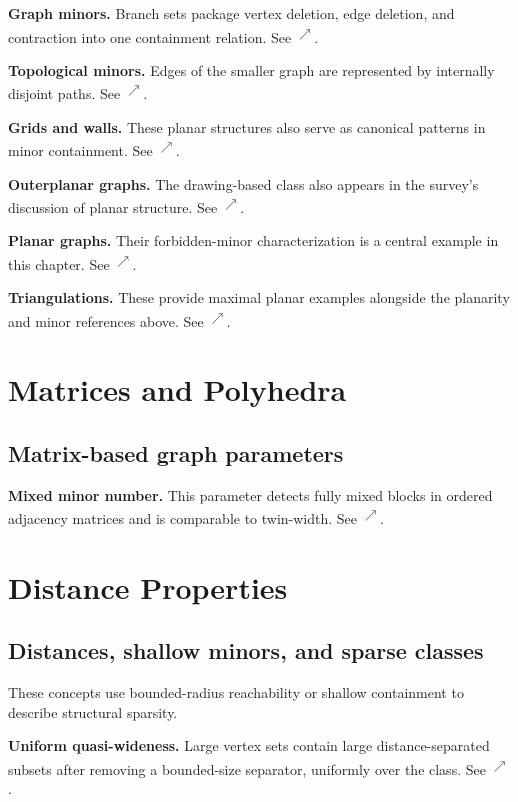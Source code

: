 \documentclass[11pt]{article}
\newcommand{\source}[2]{\textsuperscript{\href{https://laxarchive.org/#1/#2.html}{$\nearrow$}}}
\newcommand{\surveychapter}[2]{\setcounter{section}{#1}\section{#2}}
\begin{document}
\textbf{Graph minors.}
Branch sets package vertex deletion, edge deletion,
and contraction into one containment relation. See
\source{lax-68}{Lax68.GraphMinors}.

\textbf{Topological minors.}
Edges of the smaller graph are represented by
internally disjoint paths. See
\source{lax-68}{Lax68.GraphTopologicalMinors}.

\textbf{Grids and walls.}
These planar structures also serve as canonical
patterns in minor containment. See \source{lax-68}{Lax68.GridsAndWalls}.

\textbf{Outerplanar graphs.}
The drawing-based class also appears in the
survey's discussion of planar structure. See
\source{lax-68}{Lax68.Outerplanar}.

\textbf{Planar graphs.}
Their forbidden-minor characterization is a central
example in this chapter. See \source{lax-68}{Lax68.Planar}.

\textbf{Triangulations.}
These provide maximal planar examples alongside the
planarity and minor references above. See
\source{lax-68}{Lax68.Triangulations}.
\surveychapter{8}{Matrices and Polyhedra}

\subsection{Matrix-based graph parameters}

\textbf{Mixed minor number.}
This parameter detects fully mixed blocks in
ordered adjacency matrices and is comparable to twin-width. See
\source{lax-153141}{Lax153141.MixedMinorNumber}.
\surveychapter{9}{Distance Properties}

\subsection{Distances, shallow minors, and sparse classes}

These concepts use bounded-radius reachability or shallow containment to
describe structural sparsity.

\textbf{Uniform quasi-wideness.}
Large vertex sets contain large
distance-separated subsets after removing a bounded-size separator, uniformly
over the class. See
\source{lax-199508}{Lax199508.UniformQuasiWideness}.
\end{document}
